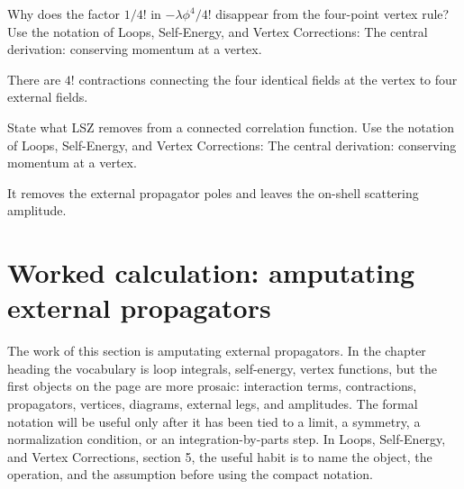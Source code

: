 \begin{exercise}
Why does the factor \(1/4!\) in \(-\lambda\phi^4/4!\) disappear from the four-point vertex rule?  Use the notation of Loops, Self-Energy, and Vertex Corrections: The central derivation: conserving momentum at a vertex.
\begin{answer}
There are \(4!\) contractions connecting the four identical fields at the vertex to four external fields.
\end{answer}
\end{exercise}

\begin{exercise}
State what LSZ removes from a connected correlation function.  Use the notation of Loops, Self-Energy, and Vertex Corrections: The central derivation: conserving momentum at a vertex.
\begin{answer}
It removes the external propagator poles and leaves the on-shell scattering amplitude.
\end{answer}
\end{exercise}



\section{Worked calculation: amputating external propagators}













The work of this section is amputating external propagators.  In the chapter heading the vocabulary is loop integrals, self-energy, vertex functions, but the first objects on the page are more prosaic: interaction terms, contractions, propagators, vertices, diagrams, external legs, and amplitudes.  The formal notation will be useful only after it has been tied to a limit, a symmetry, a normalization condition, or an integration-by-parts step.  In Loops, Self-Energy, and Vertex Corrections, section 5, the useful habit is to name the object, the operation, and the assumption before using the compact notation.

